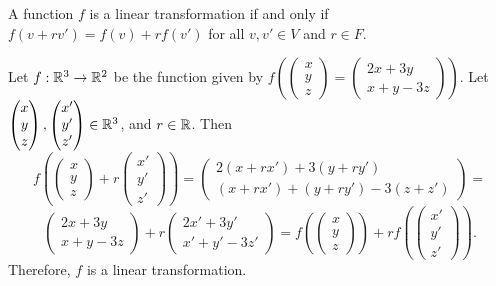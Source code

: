 \begin{rmk}
    A function $f$ is a linear transformation if and only if $f(v + rv') = f(v) + rf(v')$ for all $v, v' \in V$ and $r \in F$.
\end{rmk}

\begin{exmp}
    Let $f: \mathbb{R}^3 \to \mathbb{R}^2$ be the function given by $f\left(
    \begin{pmatrix}
        x \\ y \\ z
    \end{pmatrix} =
    \begin{pmatrix}
        2x + 3y \\ x + y - 3z
    \end{pmatrix}\right)$. Let $\begin{pmatrix}
        x \\ y \\ z
    \end{pmatrix}, \begin{pmatrix}
        x' \\ y' \\ z'
    \end{pmatrix} \in \mathbb{R}^3$, and $r \in \mathbb{R}$. Then \[f\left(\begin{pmatrix}
        x \\ y \\ z
    \end{pmatrix} + r\begin{pmatrix}
        x'\\ y' \\ z'
    \end{pmatrix}\right) = \begin{pmatrix}
        2(x + rx') + 3(y + ry') \\
        (x + rx') + (y + ry') - 3(z + z')
    \end{pmatrix} = \]
    \[\begin{pmatrix}
        2x + 3y \\
        x + y - 3z
    \end{pmatrix} + r\begin{pmatrix}
        2x' + 3y' \\
        x' + y' - 3z'
    \end{pmatrix} = f\left(\begin{pmatrix}
        x \\ y \\ z
    \end{pmatrix}\right) + rf\left(\begin{pmatrix}
        x'\\ y' \\ z'
    \end{pmatrix}\right).\]
    Therefore, $f$ is a linear transformation.
\end{exmp}

